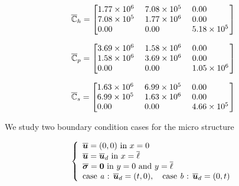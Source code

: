 \documentclass[3p]{elsarticle}
\begin{document}
\begin{equation}
\overline{\mathbb{C}}_h = 
  \begin{bmatrix}
   \begin{tabular}{ @{}*{3}{S[round-mode=places,
                    round-integer-to-decimal,round-precision=2,
                    table-format=1.2e4,table-column-width=16mm,table-number-alignment=center]}@{}
		  }
    1.7722e+06 & 7.08e+05 & 0.0\\
    7.08e+05 & 1.77e+06 & 0.0\\
    0.0          & 0.0  & 5.18e+05
   \end{tabular}
  \end{bmatrix}
\end{equation}

\begin{equation}
\overline{\mathbb{C}}_p = 
  \begin{bmatrix}
   \begin{tabular}{ @{}*{3}{S[round-mode=places,
                    round-integer-to-decimal,round-precision=2,
                    table-format=1.2e4,table-column-width=16mm,table-number-alignment=center]}@{}
		  }
    3.691352e+06 & 1.582008e+06 & 0.0\\
    1.582008e+06 & 3.691352e+06 & 0.0\\
    0.0          & 0.0          & 1.054672e+06
   \end{tabular}
  \end{bmatrix}
\end{equation}

\begin{equation}
  \overline{\mathbb{C}}_s = 
  \begin{bmatrix}
   \begin{tabular}{ @{}*{3}{S[round-mode=places,
                    round-integer-to-decimal,round-precision=2,
                    table-format=1.2e4,table-column-width=16mm,table-number-alignment=center]}@{}
		  }
    1.630150e+06 & 6.986357e+05 & 0.0\\
    6.986357e+05 & 1.630150e+06 & 0.0\\
    0.0          & 0.0          & 4.657572e+05
   \end{tabular}
  \end{bmatrix}
\end{equation}

We study two boundary condition cases for the micro structure

\begin{equation}
\left\{
\begin{array}{ll}
\overline{\bm{u}} = (0,0) \text{ in } x=0\\
\overline{\bm{u}} = \overline{\bm{u}}_d \text{ in } x=\overline{\ell}\\
\overline{\bm{\sigma}} = \bm{0} \text{ in } y=0\text{ and }y=\overline{\ell}\\
\text{case \emph{a} : } \overline{\bm{u}}_d = (t,0) , \quad
\text{case \emph{b} : } \overline{\bm{u}}_d = (0,t)
\end{array}
\right.
\label{micro_eqs}
\end{equation}
\end{document}
